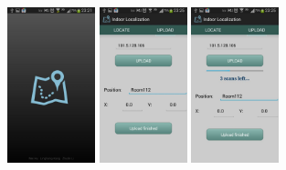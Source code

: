 \documentclass[a4paper,10pt]{article}
\begin{document}
\begin{CJK*}{UTF8}{gbsn}
\begin{figure}[h]
\begin{minipage}[t]{0.3\linewidth}
\centering
\includegraphics[width=1in]{1.jpg}
\end{minipage}
\begin{minipage}[t]{0.3\linewidth}
\centering
\includegraphics[width=1in]{2.jpg}
\end{minipage}
\begin{minipage}[t]{0.3\linewidth}
\centering
\includegraphics[width=1in]{3.jpg}
\end{minipage}
\end{figure}


\end{CJK*}
\end{document}
